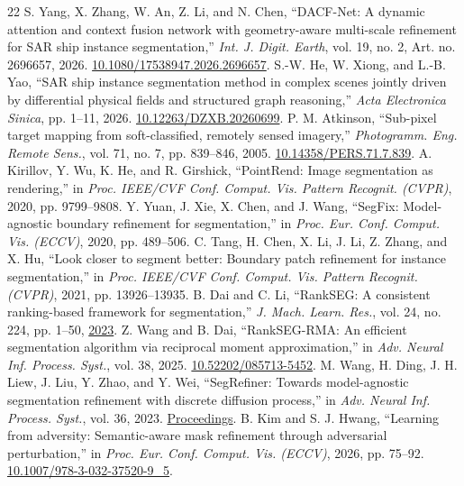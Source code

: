 \documentclass[journal]{IEEEtran}
\begin{document}
\begin{thebibliography}{22}
 S. Yang, X. Zhang, W. An, Z. Li, and N. Chen, ``DACF-Net: A dynamic attention and context fusion network with geometry-aware multi-scale refinement for SAR ship instance segmentation,'' \emph{Int. J. Digit. Earth}, vol. 19, no. 2, Art. no. 2696657, 2026. \href{https://doi.org/10.1080/17538947.2026.2696657}{10.1080/17538947.2026.2696657}.
 S.-W. He, W. Xiong, and L.-B. Yao, ``SAR ship instance segmentation method in complex scenes jointly driven by differential physical fields and structured graph reasoning,'' \emph{Acta Electronica Sinica}, pp. 1--11, 2026. \href{https://doi.org/10.12263/DZXB.20260699}{10.12263/DZXB.20260699}.
 P. M. Atkinson, ``Sub-pixel target mapping from soft-classified, remotely sensed imagery,'' \emph{Photogramm. Eng. Remote Sens.}, vol. 71, no. 7, pp. 839--846, 2005. \href{https://doi.org/10.14358/PERS.71.7.839}{10.14358/PERS.71.7.839}.
 A. Kirillov, Y. Wu, K. He, and R. Girshick, ``PointRend: Image segmentation as rendering,'' in \emph{Proc. IEEE/CVF Conf. Comput. Vis. Pattern Recognit. (CVPR)}, 2020, pp. 9799--9808.
 Y. Yuan, J. Xie, X. Chen, and J. Wang, ``SegFix: Model-agnostic boundary refinement for segmentation,'' in \emph{Proc. Eur. Conf. Comput. Vis. (ECCV)}, 2020, pp. 489--506.
 C. Tang, H. Chen, X. Li, J. Li, Z. Zhang, and X. Hu, ``Look closer to segment better: Boundary patch refinement for instance segmentation,'' in \emph{Proc. IEEE/CVF Conf. Comput. Vis. Pattern Recognit. (CVPR)}, 2021, pp. 13926--13935.
 B. Dai and C. Li, ``RankSEG: A consistent ranking-based framework for segmentation,'' \emph{J. Mach. Learn. Res.}, vol. 24, no. 224, pp. 1--50, \href{https://www.jmlr.org/papers/v24/22-0712.html}{2023}.
 Z. Wang and B. Dai, ``RankSEG-RMA: An efficient segmentation algorithm via reciprocal moment approximation,'' in \emph{Adv. Neural Inf. Process. Syst.}, vol. 38, 2025. \href{https://doi.org/10.52202/085713-5452}{10.52202/085713-5452}.
 M. Wang, H. Ding, J. H. Liew, J. Liu, Y. Zhao, and Y. Wei, ``SegRefiner: Towards model-agnostic segmentation refinement with discrete diffusion process,'' in \emph{Adv. Neural Inf. Process. Syst.}, vol. 36, 2023. \href{https://proceedings.neurips.cc/paper_files/paper/2023/hash/fc0cc55dca3d791c4a0bb2d8ddeefe4f-Abstract-Conference.html}{Proceedings}.
 B. Kim and S. J. Hwang, ``Learning from adversity: Semantic-aware mask refinement through adversarial perturbation,'' in \emph{Proc. Eur. Conf. Comput. Vis. (ECCV)}, 2026, pp. 75--92. \href{https://doi.org/10.1007/978-3-032-37520-9_5}{10.1007/978-3-032-37520-9\_5}.

\end{thebibliography}
\end{document}
